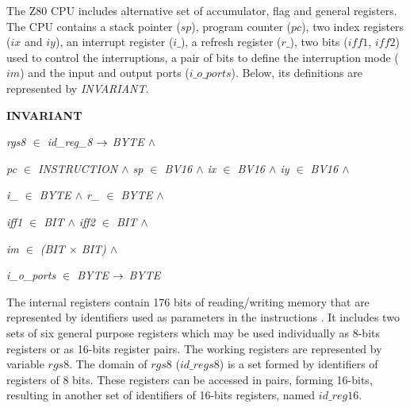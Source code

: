 \documentclass[11pt]{article} %
\begin{document}
The Z80 CPU includes alternative set of accumulator, flag and general registers. The CPU contains a stack
pointer ($\mathit{sp}$), program counter ($\mathit{pc}$), two index registers ($\mathit{ix}$ and $\mathit{iy}$), an
interrupt register ($\mathit{i\_}$), a refresh register ($\mathit{r\_}$), two bits ($\mathit{iff1}$,
$\mathit{iff2}$) used to control the interruptions, a pair of bits to define the interruption mode ($\mathit{im}$)
and the input and output ports ($\mathit{i\_o\_ports}$). Below, its definitions are represented by
\textit{INVARIANT}.
  
\begin{sloppypar}
\bf INVARIANT

\hspace*{0.10in}\it rgs8  $\in$  \it id\_reg\_8  $\rightarrow$  \it BYTE  $\land$ 

\hspace*{0.10in}\it pc  $\in$  \it INSTRUCTION  $\land$  \it sp  $\in$  \it BV16  $\land$  \it ix  $\in$  \it BV16  $\land$  \it iy  $\in$  \it BV16  $\land$ 

\hspace*{0.10in}\it i\_  $\in$  \it BYTE  $\land$  \it r\_ $\in$  \it BYTE  $\land$  

\hspace*{0.10in}\it iff1  $\in$  \it BIT  $\land$ \hspace*{0.10in}\it iff2  $\in$  \it BIT  $\land$ 

\hspace*{0.10in}\it im $\in$ (\it BIT $\times$ \it BIT\rm )  $\land$ 

\hspace*{0.10in}\it i\_o\_ports  $\in$  \it BYTE  $\rightarrow$  \it BYTE
\end{sloppypar}

% 

 The internal registers contain 176 bits of reading/writing memory that are represented by
identifiers used as parameters in the instructions . It includes two sets of six general purpose
registers which may be used individually as 8-bits registers or as 16-bits register pairs.  The working registers
are represented by variable $\mathit{rgs8}$. The domain of $\mathit{rgs8}$ ($\mathit{id\_regs8}$) is a set
formed by identifiers of registers of 8 bits. These registers can be accessed in pairs, forming 16-bits,
resulting in another set of identifiers of 16-bits registers, named $\mathit{id\_reg16}$.
\end{document}
